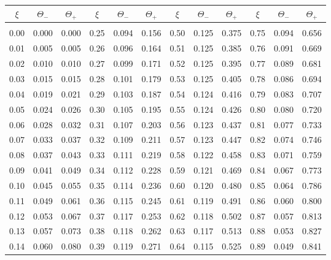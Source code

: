 \begin{table}
\centering
\begin{tabular}{ccc|ccc|ccc|ccc}
$\xi$ & $\Theta_-$ & $\Theta_+$ & $\xi$ & $\Theta_-$ & $\Theta_+$ & $\xi$ & $\Theta_-$ & $\Theta_+$
&$\xi$ & $\Theta_-$ & $\Theta_+$\\\hline
&&&&&&&&&&&\\[-2ex]
  0.00 &   0.000 &   0.000 &   0.25 &   0.094 &   0.156 &   0.50 &   0.125 &   0.375 &   0.75 &   0.094 &   0.656\\
  0.01 &   0.005 &   0.005 &   0.26 &   0.096 &   0.164 &   0.51 &   0.125 &   0.385 &   0.76 &   0.091 &   0.669\\
  0.02 &   0.010 &   0.010 &   0.27 &   0.099 &   0.171 &   0.52 &   0.125 &   0.395 &   0.77 &   0.089 &   0.681\\
  0.03 &   0.015 &   0.015 &   0.28 &   0.101 &   0.179 &   0.53 &   0.125 &   0.405 &   0.78 &   0.086 &   0.694\\
  0.04 &   0.019 &   0.021 &   0.29 &   0.103 &   0.187 &   0.54 &   0.124 &   0.416 &   0.79 &   0.083 &   0.707\\
  0.05 &   0.024 &   0.026 &   0.30 &   0.105 &   0.195 &   0.55 &   0.124 &   0.426 &   0.80 &   0.080 &   0.720\\
  0.06 &   0.028 &   0.032 &   0.31 &   0.107 &   0.203 &   0.56 &   0.123 &   0.437 &   0.81 &   0.077 &   0.733\\
  0.07 &   0.033 &   0.037 &   0.32 &   0.109 &   0.211 &   0.57 &   0.123 &   0.447 &   0.82 &   0.074 &   0.746\\
  0.08 &   0.037 &   0.043 &   0.33 &   0.111 &   0.219 &   0.58 &   0.122 &   0.458 &   0.83 &   0.071 &   0.759\\
  0.09 &   0.041 &   0.049 &   0.34 &   0.112 &   0.228 &   0.59 &   0.121 &   0.469 &   0.84 &   0.067 &   0.773\\
  0.10 &   0.045 &   0.055 &   0.35 &   0.114 &   0.236 &   0.60 &   0.120 &   0.480 &   0.85 &   0.064 &   0.786\\
  0.11 &   0.049 &   0.061 &   0.36 &   0.115 &   0.245 &   0.61 &   0.119 &   0.491 &   0.86 &   0.060 &   0.800\\
  0.12 &   0.053 &   0.067 &   0.37 &   0.117 &   0.253 &   0.62 &   0.118 &   0.502 &   0.87 &   0.057 &   0.813\\
  0.13 &   0.057 &   0.073 &   0.38 &   0.118 &   0.262 &   0.63 &   0.117 &   0.513 &   0.88 &   0.053 &   0.827\\
  0.14 &   0.060 &   0.080 &   0.39 &   0.119 &   0.271 &   0.64 &   0.115 &   0.525 &   0.89 &   0.049 &   0.841\\

\end{tabular}
\end{table}
